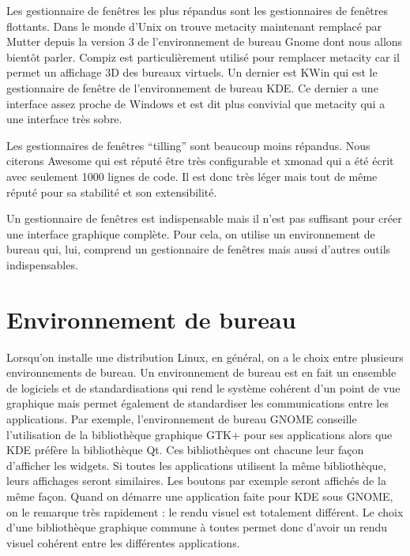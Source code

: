 Les gestionnaire de fenêtres les plus répandus sont les gestionnaires de fenêtres flottants. Dans le monde d’Unix on trouve metacity maintenant remplacé par Mutter depuis la version 3 de l’environnement de bureau Gnome dont nous allons bientôt parler. Compiz est particulièrement utilisé pour remplacer metacity car il permet un affichage 3D des bureaux virtuels. Un dernier est KWin qui est le gestionnaire de fenêtre de l’environnement de bureau KDE. Ce dernier a une interface assez proche de Windows et est dit plus convivial que metacity qui a une interface très sobre.

Les gestionnaires de fenêtres “tilling” sont beaucoup moins répandus. Nous citerons Awesome qui est réputé être très configurable et xmonad qui a été écrit avec seulement 1000 lignes de code. Il est donc très léger mais tout de même réputé pour sa stabilité et son extensibilité.

Un gestionnaire de fenêtres est indispensable mais il n’est pas suffisant pour créer une interface graphique complète. Pour cela, on utilise un environnement de bureau qui, lui, comprend un gestionnaire de fenêtres mais aussi d’autres outils indispensables.

\section{Environnement de bureau}
Lorsqu'on installe une distribution Linux, en général, on a le choix entre plusieurs environnements de bureau. Un environnement de bureau est en fait un ensemble de logiciels et de standardisations qui rend le système cohérent d'un point de vue graphique mais permet également de standardiser les communications entre les applications. Par exemple, l'environnement de bureau GNOME conseille l'utilisation de la bibliothèque graphique GTK+ pour ses applications alors que KDE préfère la bibliothèque Qt. Ces bibliothèques ont chacune leur façon d'afficher les widgets. Si toutes les applications utilisent la même bibliothèque, leurs affichages seront similaires. Les boutons par exemple seront affichés de la même façon. Quand on démarre une application faite pour KDE sous GNOME, on le remarque très rapidement : le rendu visuel est totalement différent. Le choix d'une bibliothèque graphique commune à toutes permet donc d'avoir un rendu visuel cohérent entre les différentes applications.

